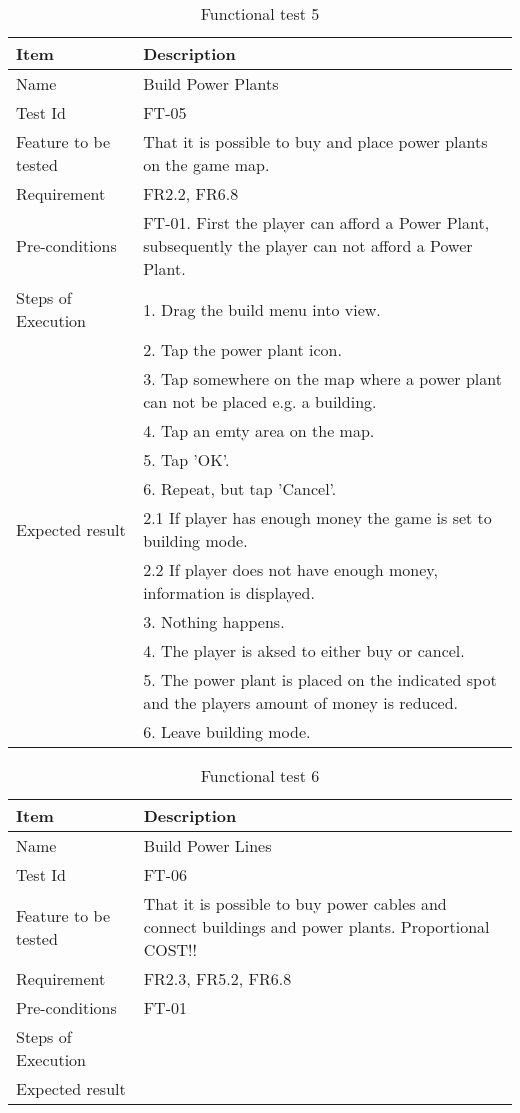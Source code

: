 \begin{table}[H]
\centering
	\begin{tabular}{ l | p{8cm} }
		\hline
		{\bf Item} & {\bf Description} \\ \hline
		Name & Build Power Plants \\ 
		Test Id & FT-05 \\ 
		Feature to be tested & That it is possible to buy and place power plants on the game map. \\ 
		Requirement & FR2.2, FR6.8 \\ 
		Pre-conditions & FT-01. First the player can afford a Power Plant, subsequently the player can not afford a Power Plant. \\
		Steps of Execution & 1. Drag the build menu into view. \\ 
		& 2. Tap the power plant icon. \\
		& 3. Tap somewhere on the map where a power plant can not be placed e.g. a building. \\
		& 4. Tap an emty area on the map. \\
		& 5. Tap 'OK'. \\
		& 6. Repeat, but tap 'Cancel'. \\
		Expected result & 2.1 If player has enough money the game is set to building mode. \\
		& 2.2 If player does not have enough money, information is displayed. \\
		& 3. Nothing happens. \\ 
		& 4. The player is aksed to either buy or cancel. \\
		& 5. The power plant is placed on the indicated spot and the players amount of money is reduced. \\
		& 6. Leave building mode. \\
	\end{tabular}
	\caption{Functional test 5}
\end{table}

\begin{table}[H]
\centering
	\begin{tabular}{ l | p{8cm} }
		\hline
		{\bf Item} & {\bf Description} \\ \hline
		Name & Build Power Lines \\ 
		Test Id & FT-06 \\ 
		Feature to be tested &  That it is possible to buy power cables and connect buildings and power plants. Proportional COST!! \\ 
		Requirement & FR2.3, FR5.2, FR6.8 \\ 
		Pre-conditions & FT-01 \\ 
		Steps of Execution & \\ 
		Expected result & \\ 
	\end{tabular}
	\caption{Functional test 6}
\end{table}















